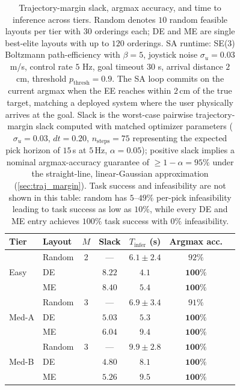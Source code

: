 \documentclass[letterpaper, 10pt, conference]{ieeeconf}
\begin{document}
\begin{table}[t]
\centering
\caption{Trajectory-margin slack, argmax accuracy, and time to
inference across tiers.  Random denotes $10$ random feasible layouts
per tier with $30$ orderings each; DE and ME are single best-elite
layouts with up to $120$ orderings.  SA runtime: SE(3) Boltzmann
path-efficiency with $\beta{=}5$, joystick noise $\sigma_u{=}0.03$
m/s, control rate $5$ Hz, goal timeout $30$ s, arrival distance
$2$ cm, threshold $p_{\mathrm{thresh}}{=}0.9$. The SA loop commits
on the current argmax when the EE reaches within $2$\,cm of the true
target, matching a deployed system where the user physically arrives
at the goal. Slack is the worst-case pairwise trajectory-margin
slack computed with matched optimizer parameters ($\sigma_u{=}0.03$,
$dt{=}0.20$, $n_\text{steps}{=}75$ representing the expected pick
horizon of $15$\,s at $5$\,Hz, $\alpha{=}0.05$); positive slack
implies a nominal argmax-accuracy guarantee of
$\geq 1 - \alpha = 95\%$ under the straight-line, linear-Gaussian
approximation (\cref{sec:traj_margin}). Task success and
infeasibility are not shown in this table: random has
$5$--$49\%$ per-pick infeasibility leading to task success as low as
$10\%$, while every DE and ME entry achieves $100\%$ task success
with $0\%$ infeasibility.}
\label{tab:main_results}
\small
\setlength{\tabcolsep}{5pt}
\begin{tabular}{@{}llccccc@{}}
\toprule
\textbf{Tier} & \textbf{Layout} & $M$ &
  Slack &
  $T_{\mathrm{infer}}$ (s) &
  Argmax acc. \\
\midrule
\multirow{3}{*}{Easy}
  & Random    & 2 & ---             & $6.1 \pm 2.4$ & $92\%$ \\
  & DE        &   & $8.22$          & $\mathbf{4.1}$ & $\mathbf{100\%}$ \\
  & ME        &   & $\mathbf{8.40}$ & $5.4$          & $\mathbf{100\%}$ \\
\midrule
\multirow{3}{*}{Med-A}
  & Random    & 3 & ---  & $\mathbf{6.9 \pm 3.4}$ & $91\%$ \\
  & DE        &   & $5.03$          & $5.3$ & $\mathbf{100\%}$ \\
  & ME        &   & $\mathbf{6.04}$ & $9.4$ & $\mathbf{100\%}$ \\
\midrule
\multirow{3}{*}{Med-B}
  & Random    & 3 & ---             & $9.9 \pm 2.8$ & $\mathbf{100\%}$ \\
  & DE        &   & $4.80$          & $\mathbf{8.1}$ & $\mathbf{100\%}$ \\
  & ME        &   & $\mathbf{5.26}$ & $9.5$          & $\mathbf{100\%}$ \\

\end{tabular}
\end{table}
\end{document}
